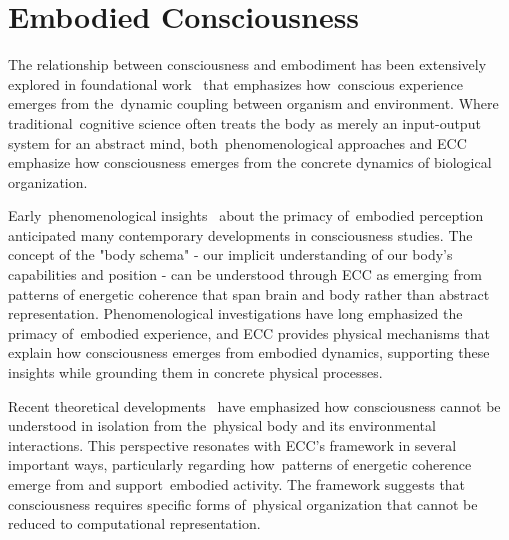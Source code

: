 \section{Embodied Consciousness~}

The relationship between consciousness and embodiment has been extensively explored in foundational work~\cite{Varela1991, MerleauPonty1962, Varela2017} that emphasizes how~conscious experience emerges from the~dynamic coupling between organism and environment. Where traditional~cognitive science often treats the body as merely an input-output system for an abstract mind, both~phenomenological approaches and ECC emphasize how consciousness emerges from the concrete dynamics of biological organization.

Early~phenomenological insights~\cite{MerleauPonty1962, gallagher2020phenomenological} about the primacy of~embodied perception anticipated many contemporary developments in consciousness studies. The concept of the "body schema" - our implicit understanding of our body's capabilities and position - can be understood through ECC as emerging from patterns of energetic coherence that span brain and body rather than abstract representation. Phenomenological investigations have long emphasized the primacy of~embodied experience, and ECC provides physical mechanisms that explain how consciousness emerges from embodied dynamics, supporting these insights while grounding them in concrete physical processes.

Recent theoretical developments~\cite{Thompson2007, thompson2010mind} have emphasized how consciousness cannot be understood in isolation from the~physical body and its environmental interactions. This perspective resonates with ECC's framework in several important ways, particularly regarding how~patterns of energetic coherence emerge from and support~embodied activity. The framework suggests that consciousness requires specific forms of~physical organization that cannot be reduced to computational representation.

